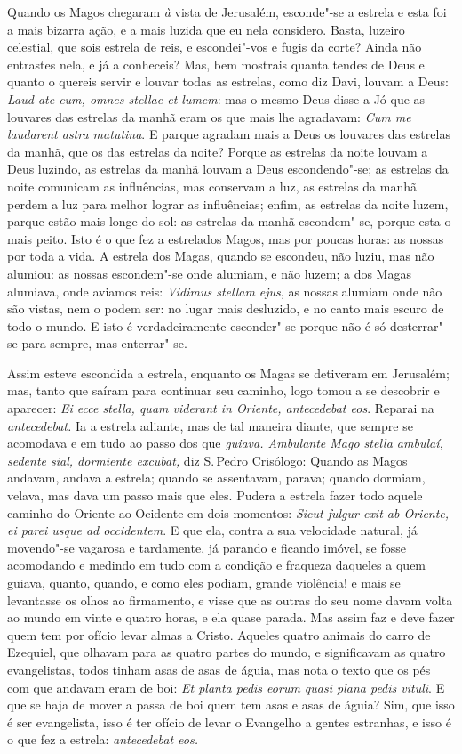 Quando os Magos chegaram \emph{à} vista de Jerusalém, esconde"-se a
estrela e esta foi a mais bizarra ação, e a mais luzida que eu nela
considero. Basta, luzeiro celestial, que sois estrela de reis, e
escondei"-vos e fugis da corte? Ainda não entrastes nela, e já a
conheceis? Mas, bem mostrais quanta tendes de Deus e quanto o quereis
servir e louvar todas as estrelas, como diz Davi, louvam a Deus:
\emph{Laud ate eum, omnes stellae et lumem}: mas o mesmo
Deus disse a Jó que as louvares das estrelas da manhã eram os que mais
lhe agradavam: \emph{Cum me laudarent astra matutina}. E
parque agradam mais a Deus os louvares das estrelas da manhã, que os das
estrelas da noite? Porque as estrelas da noite louvam a Deus luzindo, as
estrelas da manhã louvam a Deus escondendo"-se; as estrelas da noite
comunicam as influências, mas conservam a luz, as estrelas da manhã
perdem a luz para melhor lograr as influências; enfim, as estrelas da
noite luzem, parque estão mais longe do sol: as estrelas da manhã
escondem"-se, porque esta o mais peito. Isto é o que fez a estrelados
Magos, mas por poucas horas: as nossas por toda a vida. A estrela dos
Magas, quando se escondeu, não luziu, mas não alumiou: as nossas
escondem"-se onde alumiam, e não luzem; a dos Magas alumiava, onde
aviamos reis: \emph{Vidimus stellam ejus}, as nossas alumiam onde não
são vistas, nem o podem ser: no lugar mais desluzido, e no canto mais
escuro de todo o mundo. E isto é verdadeiramente esconder"-se porque não
é só desterrar"-se para sempre, mas enterrar"-se.

Assim esteve escondida a estrela, enquanto os Magas se detiveram em
Jerusalém; mas, tanto que saíram para continuar seu caminho, logo tomou
a se descobrir e aparecer: \emph{Ei ecce stella, quam viderant in
Oriente, antecedebat eos}. Reparai na \emph{antecedebat.} Ia
a estrela adiante, mas de tal maneira diante, que sempre se acomodava e
em tudo ao passo dos que \emph{guiava. Ambulante Mago stella ambulaí,
sedente sial, dormiente excubat,} diz S.\,Pedro Crisólogo: Quando as
Magos andavam, andava a estrela; quando se assentavam, parava; quando
dormiam, velava, mas dava um passo mais que eles. Pudera a estrela
fazer todo aquele caminho do Oriente ao Ocidente em dois momentos:
\emph{Sicut fulgur exit ab Oriente, ei parei usque ad occidentem}. E que ela, contra a sua velocidade natural, já movendo"-se
vagarosa e tardamente, já parando e ficando imóvel, se fosse acomodando
e medindo em tudo com a condição e fraqueza daqueles a quem guiava,
quanto, quando, e como eles podiam, grande violência! e mais se
levantasse os olhos ao firmamento, e visse que as outras do seu nome
davam volta ao mundo em vinte e quatro horas, e ela quase parada. Mas
assim faz e deve fazer quem tem por ofício levar almas a Cristo. Aqueles
quatro animais do carro de Ezequiel, que olhavam para as quatro partes
do mundo, e significavam as quatro evangelistas, todos tinham asas de
asas de águia, mas nota o texto que os pés com que andavam eram de boi:
\emph{Et planta pedis eorum quasi plana pedis vituli}. E que
se haja de mover a passa de boi quem tem asas e asas de águia? Sim, que
isso é ser evangelista, isso é ter ofício de levar o Evangelho a gentes
estranhas, e isso é o que fez a estrela: \emph{antecedebat eos.}

